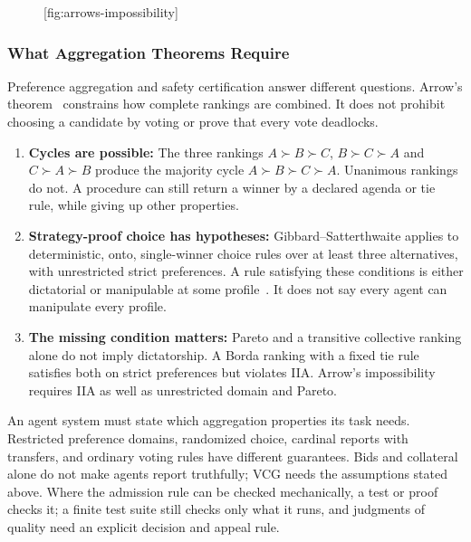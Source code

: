 \begin{figure}[tp]
  \centering
  [fig:arrows-impossibility]
\end{figure}

\subsubsection{What Aggregation Theorems Require}
\label{sec:why-arrows-matters}

Preference aggregation and safety certification answer different questions. Arrow's theorem~ constrains how complete rankings are combined. It does not prohibit choosing a candidate by voting or prove that every vote deadlocks.
\begin{enumerate}[leftmargin=1.8em,itemsep=2pt]
  \item \textbf{Cycles are possible:} The three rankings $A\succ B\succ C$, $B\succ C\succ A$ and $C\succ A\succ B$ produce the majority cycle $A\succ B\succ C\succ A$. Unanimous rankings do not. A procedure can still return a winner by a declared agenda or tie rule, while giving up other properties.
  \item \textbf{Strategy-proof choice has hypotheses:} Gibbard--Satterthwaite applies to deterministic, onto, single-winner choice rules over at least three alternatives, with unrestricted strict preferences. A rule satisfying these conditions is either dictatorial or manipulable at some profile~. It does not say every agent can manipulate every profile.
  \item \textbf{The missing condition matters:} Pareto and a transitive collective ranking alone do not imply dictatorship. A Borda ranking with a fixed tie rule satisfies both on strict preferences but violates IIA. Arrow's impossibility requires IIA as well as unrestricted domain and Pareto.
\end{enumerate}

An agent system must state which aggregation properties its task needs. Restricted preference domains, randomized choice, cardinal reports with transfers, and ordinary voting rules have different guarantees. Bids and collateral alone do not make agents report truthfully; VCG needs the assumptions stated above. Where the admission rule can be checked mechanically, a test or proof checks it; a finite test suite still checks only what it runs, and judgments of quality need an explicit decision and appeal rule.

